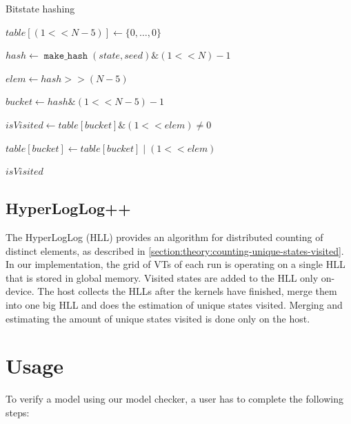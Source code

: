 \documentclass[
fancyheadings, %
%
%
]{stsreprt}
\DeclareMathOperator{\markVisited}{\texttt{mark\_visited}}
\DeclareMathOperator{\makeHash}{\texttt{make\_hash}}
\newcommand{\bitwiseAnd}{\mathbin{\text{\&}}}
\newcommand{\bitwiseOr}{\mathbin{\text{|}}}
\begin{document}
\begin{algorithm}
    \caption{Bitstate hashing}
    \label{alg:bitstate-hashing}
    \begin{algorithmic}
        \State $table[(1 << N - 5)] \gets \{0, \dots, 0\}$

        \Statex

        \Function{$\markVisited$}{table, state}
        \State $hash \gets \makeHash(state, seed) \bitwiseAnd (1 << N) - 1$

        \State $elem \gets hash >> (N - 5)$

        \State $bucket \gets hash \bitwiseAnd (1 << N - 5) - 1$

        \State $isVisited \gets table[bucket] \bitwiseAnd (1 << elem) \neq 0$

        \State $table[bucket] \gets table[bucket] \bitwiseOr (1 << elem)$

        \Statex

        \State \Return $isVisited$
        \EndFunction
    \end{algorithmic}
\end{algorithm}

\subsection{HyperLogLog++}

The HyperLogLog (HLL) provides an algorithm for distributed counting of distinct elements, as described in \cref{section:theory:counting-unique-states-visited}.
In our implementation, the grid of VTs of each run is operating on a single HLL that is stored in global memory.
Visited states are added to the HLL only on-device.
The host collects the HLLs after the kernels have finished, merge them into one big HLL and does the estimation of unique states visited.
Merging and estimating the amount of unique states visited is done only on the host.

\section{Usage}
\label{section:implementation:usage}

To verify a model using our model checker, a user has to complete the following steps:
\end{document}
